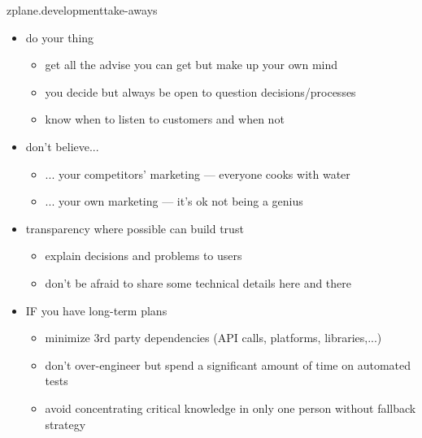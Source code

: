         \begin{frame}{zplane.development}{take-aways}
					\vspace{-3mm}
					\begin{itemize}
						\item<1-> do your thing 
							\begin{itemize}
								\item get all the advise you can get but make up your own mind
								\item you decide but always be open to question decisions/processes
								\item know when to listen to customers and when not
							\end{itemize} 
						\smallskip
						\item<2-> don't believe... 
							\begin{itemize}
								\item ... your competitors' marketing --- everyone cooks with water
								\item ... your own marketing --- it's ok not being a genius
							\end{itemize}
						\smallskip
						\item<3-> transparency where possible can build trust
							\begin{itemize}
								\item explain decisions and problems to users
								\item	don't be afraid to share some technical details here and there
							\end{itemize}
						\smallskip
						\item<4-> IF you have long-term plans
							\begin{itemize}
								\item 	minimize 3rd party dependencies (API calls, platforms, libraries,...)
								\item		don't over-engineer but spend a significant amount of time on automated tests
								\item		avoid concentrating critical knowledge in only one person without fallback strategy
							\end{itemize}
					\end{itemize}
        \end{frame}
        
        



